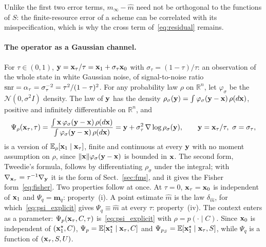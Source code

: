 Unlike the first two error terms, $m_\infty - \hat m$ need not be orthogonal to the functions of $S$: the
finite-resource error of a scheme can be correlated with its misspecification, which is why the cross term
of~\eqref{eq:residual} remains.

\paragraph{The operator as a Gaussian channel.}
For $\tau \in (0,1)$, $\mathbf{y} = \mathbf{x}_\tau / \tau = \mathbf{x}_1 + \sigma_\tau \mathbf{x}_0$ with $\sigma_\tau = (1-\tau)/\tau$: an
observation of the whole state in white Gaussian noise, of signal-to-noise ratio
$\mathrm{snr} = \alpha_\tau = \sigma_\tau^{-2} = \tau^2/(1-\tau)^2$. For any probability law $\rho$ on $\mathbb{R}^n$, let
$\varphi_\sigma$ be the $\mathcal{N}(0, \sigma^2 I)$ density. The law of $\mathbf{y}$ has the density
$\rho_\sigma(\mathbf{y}) = \int \varphi_\sigma(\mathbf{y} - \mathbf{x})\, \rho(d\mathbf{x})$, positive and infinitely differentiable on
$\mathbb{R}^n$, and
\begin{equation}\label{eq:psi_explicit}
  \Psi_\rho(\mathbf{x}_\tau, \tau)
  = \frac{\int \mathbf{x}\, \varphi_\sigma(\mathbf{y} - \mathbf{x})\, \rho(d\mathbf{x})}{\int \varphi_\sigma(\mathbf{y} - \mathbf{x})\, \rho(d\mathbf{x})}
  = \mathbf{y} + \sigma_\tau^2\, \nabla \log \rho_\sigma(\mathbf{y}), \qquad \mathbf{y} = \mathbf{x}_\tau / \tau,\ \sigma = \sigma_\tau ,
\end{equation}
is a version of $\mathbb{E}_\rho[\mathbf{x}_1 \mid \mathbf{x}_\tau]$, finite and continuous at every $\mathbf{y}$ with no moment assumption on
$\rho$, since $\|\mathbf{x}\|\varphi_\sigma(\mathbf{y} - \mathbf{x})$ is bounded in $\mathbf{x}$. The second form, Tweedie's formula, follows by
differentiating $\rho_\sigma$ under the integral; with $\nabla_{\mathbf{x}_\tau} = \tau^{-1}\nabla_{\mathbf{y}}$ it is the form of
Sect.~\ref{sec:fms}, and it gives the Fisher form~\eqref{eq:fisher}. Two properties follow at once. At $\tau = 0$,
$\mathbf{x}_\tau = \mathbf{x}_0$ is independent of $\mathbf{x}_1$ and $\Psi_q = \mathbf{m}_q$: property~(i). A point estimate $\hat m$
is the law $\delta_{\hat m}$, for which~\eqref{eq:psi_explicit} gives $\Psi_q \equiv \hat m$ at every $\tau$:
property~(iv). The context enters as a parameter: $\Psi_p(\mathbf{x}_\tau, C, \tau)$ is~\eqref{eq:psi_explicit} with
$\rho = p(\cdot \mid C)$. Since $\mathbf{x}_0$ is independent of $(\mathbf{x}_1^\star, C)$,
$\Psi_p = \mathbb{E}[\mathbf{x}_1^\star \mid \mathbf{x}_\tau, C]$ and $\Psi_{p_S} = \mathbb{E}[\mathbf{x}_1^\star \mid \mathbf{x}_\tau, S]$, while $\Psi_q$ is a
function of $(\mathbf{x}_\tau, S, U)$.

